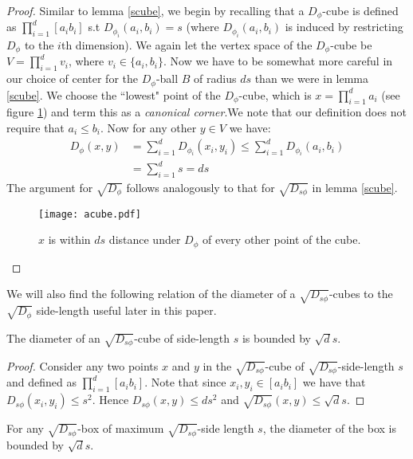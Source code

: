\documentclass[11pt]{myclass}
\newcommand{\breg}{\ensuremath{D_\phi}}
\newcommand{\sbreg}{\ensuremath{D_{s\phi}}}
\begin{document}
\begin{proof}
Similar to lemma \ref{scube}, we begin by recalling that a $\breg$-cube is defined as $\prod_{i=1}^d [a_i b_i]$ s.t $D_{ \phi_i}(a_i,b_i) = s$ (where $D_{ \phi_i}(a_i,b_i)$ is
induced by restricting $\breg$ to the $i$th dimension). We again let the vertex space of the $\breg$-cube be $V = \prod_{i=1}^d v_i$, where $v_i \in \{a_i, b_i \}$. Now we have to be somewhat more careful in our choice of center for the $\breg$-ball $B$ of
radius $ds$ than we were in lemma \ref{scube}. We choose the ``lowest" point of the $\breg$-cube, which is $x = \prod_{i=1}^d a_i$ (see figure \ref{fig:acube})
and term this as a \emph{canonical corner}.We note that our definition does not require that $a_i \leq b_i$. Now for any other $y \in V$ we have:
\begin{align*}
\breg(x,y) &= \sum_{i=1}^d D_{ \phi_i} (x_i,y_i) \leq \sum_{i=1}^d D_{ \phi_i} (a_i,b_i)\\
			 &= \sum_{i=1}^d s = ds			
\end{align*} 
The argument for $\sqrt{\breg}$ follows analogously to that for $\sqrt{\sbreg}$ in lemma \ref{scube}. 

\begin{figure}[H]
  \begin{center}
    \texttt{[image: acube.pdf]}
  \end{center}
  \caption{$x$ is within $ds$ distance under $\breg$ of every other point of the cube.}
  \label{fig:acube}
\end{figure}
\end{proof}


We will also find the following relation of the diameter of a $\sqrt{\sbreg}$-cubes to the $\sqrt{\breg}$ side-length useful later in this paper.

\begin{lemma}\label{diamtolen}
The diameter of an $\sqrt{\sbreg}$-cube of side-length $s$ is bounded by $\sqrt{d} s$. 
\end{lemma}
\begin{proof}
Consider any two points $x$ and $y$ in the $\sqrt{\sbreg}$-cube of $\sqrt{\sbreg}$-side-length $s$ 
and defined as $\prod_{i=1}^d [a_i b_i]$. Note that since $x_i, y_i \in [a_i b_i]$ we have that $\sbreg(x_i,y_i) \leq s^2$.
Hence $\sbreg(x,y) \leq ds^2 $ and $\sqrt{\sbreg}(x,y) \leq \sqrt{d} s$.
\end{proof}
\begin{corollary}
For any $\sqrt{\sbreg}$-box of maximum $\sqrt{\sbreg}$-side length $s$, the diameter of the box is bounded by $\sqrt{d} s$.
\end{corollary}
\end{document}
